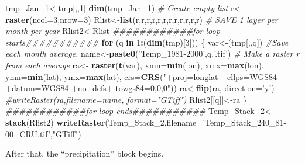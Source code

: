 \documentclass[
  10pt,
  b5paper,
]{book}
\newenvironment{Shaded}{\begin{snugshade}}{\end{snugshade}}
\newcommand{\CommentTok}[1]{\textcolor[rgb]{0.56,0.35,0.01}{\textit{#1}}}
\newcommand{\ControlFlowTok}[1]{\textcolor[rgb]{0.13,0.29,0.53}{\textbf{#1}}}
\newcommand{\DataTypeTok}[1]{\textcolor[rgb]{0.13,0.29,0.53}{#1}}
\newcommand{\DecValTok}[1]{\textcolor[rgb]{0.00,0.00,0.81}{#1}}
\newcommand{\KeywordTok}[1]{\textcolor[rgb]{0.13,0.29,0.53}{\textbf{#1}}}
\newcommand{\NormalTok}[1]{#1}
\newcommand{\OperatorTok}[1]{\textcolor[rgb]{0.81,0.36,0.00}{\textbf{#1}}}
\newcommand{\StringTok}[1]{\textcolor[rgb]{0.31,0.60,0.02}{#1}}
\begin{document}
\begin{Shaded}
\begin{Highlighting}[]
\NormalTok{tmp_Jan_}\DecValTok{1}\NormalTok{<-tmp[,,}\DecValTok{1}\NormalTok{]}
 \KeywordTok{dim}\NormalTok{(tmp_Jan_}\DecValTok{1}\NormalTok{)}
\CommentTok{# Create empty list}
\NormalTok{r<-}\KeywordTok{raster}\NormalTok{(}\DataTypeTok{ncol=}\DecValTok{3}\NormalTok{,}\DataTypeTok{nrow=}\DecValTok{3}\NormalTok{)}
\NormalTok{Rlist<-}\KeywordTok{list}\NormalTok{(r,r,r,r,r,r,r,r,r,r,r,r)}
 \CommentTok{# SAVE 1 layer per month per year}
\NormalTok{ Rlist2<-Rlist}
\CommentTok{############for loop starts###########}
 \ControlFlowTok{for}\NormalTok{ (q }\ControlFlowTok{in} \DecValTok{1}\OperatorTok{:}\NormalTok{(}\KeywordTok{dim}\NormalTok{(tmp)[}\DecValTok{3}\NormalTok{])) \{}
\NormalTok{var<-(tmp[,,q])}
 \CommentTok{#Save each month average. }
\NormalTok{ name<-}\KeywordTok{paste0}\NormalTok{(}\StringTok{'Temp_1981-2000'}\NormalTok{,q,}\StringTok{'.tif'}\NormalTok{)}
 \CommentTok{# Make a raster r from each average}
\NormalTok{ra<-}\StringTok{ }\KeywordTok{raster}\NormalTok{(}\KeywordTok{t}\NormalTok{(var), }\DataTypeTok{xmn=}\KeywordTok{min}\NormalTok{(lon), }\DataTypeTok{xmx=}\KeywordTok{max}\NormalTok{(lon), }\DataTypeTok{ymn=}\KeywordTok{min}\NormalTok{(lat), }\DataTypeTok{ymx=}\KeywordTok{max}\NormalTok{(lat), }\DataTypeTok{crs=}\KeywordTok{CRS}\NormalTok{(}\StringTok{"+proj=longlat +ellps=WGS84 +datum=WGS84 +no_defs+ towgs84=0,0,0"}\NormalTok{))}
\NormalTok{ra<-}\KeywordTok{flip}\NormalTok{(ra, }\DataTypeTok{direction=}\StringTok{'y'}\NormalTok{)}
\CommentTok{#writeRaster(ra,filename=name, format="GTiff")}
\NormalTok{Rlist2[[q]]<-ra}
\NormalTok{\}}
\CommentTok{############for loop ends###########}
\NormalTok{Temp_Stack_}\DecValTok{2}\NormalTok{<-}\KeywordTok{stack}\NormalTok{(Rlist2)}
\KeywordTok{writeRaster}\NormalTok{(Temp_Stack_}\DecValTok{2}\NormalTok{,}\DataTypeTok{filename=}\StringTok{'Temp_Stack_240_81-00_CRU.tif'}\NormalTok{,}\StringTok{"GTiff"}\NormalTok{)}
\end{Highlighting}
\end{Shaded}

After that, the ``precipitation'' block begins.
\end{document}

